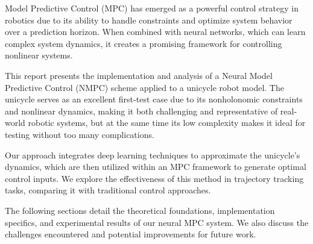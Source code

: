 Model Predictive Control (MPC) has emerged as a powerful control strategy
in robotics due to its ability to handle constraints and optimize system
behavior over a prediction horizon. When combined with neural networks,
which can learn complex system dynamics, it creates a promising framework
for controlling nonlinear systems.

This report presents the implementation and analysis of a Neural Model
Predictive Control (NMPC) scheme applied to a unicycle robot model. The
unicycle serves as an excellent first-test case due to its nonholonomic
constraints and nonlinear dynamics, making it both challenging and
representative of real-world robotic systems, but at the same time its 
low complexity makes it ideal for testing without too many complications.

Our approach integrates deep learning techniques to approximate the
unicycle's dynamics, which are then utilized within an MPC framework to
generate optimal control inputs. We explore the effectiveness of this
method in trajectory tracking tasks, comparing it with traditional control
approaches.

The following sections detail the theoretical foundations, implementation
specifics, and experimental results of our neural MPC system. We also
discuss the challenges encountered and potential improvements for future
work.